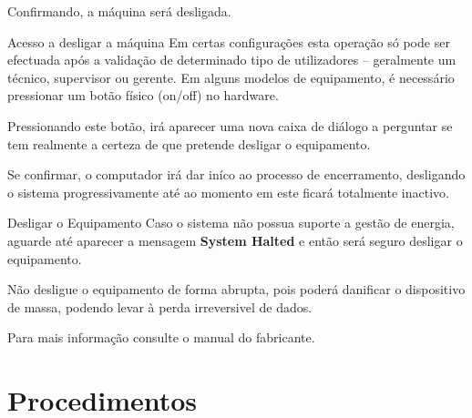 \documentclass[a4paper,11pt,openany]{memoir}
\begin{document}
Confirmando, a máquina será desligada.

\begin{bclogo}[couleur=blue!10,arrondi=0.1,logo=\bclampe,ombre=true]{Acesso a desligar a máquina}
Em certas configurações esta operação só pode ser efectuada após a validação de
determinado tipo de utilizadores – geralmente um técnico, supervisor ou gerente.
Em alguns modelos de equipamento, é necessário pressionar um botão físico
(on/off) no hardware.
\end{bclogo}

Pressionando este botão, irá aparecer uma nova caixa de diálogo a perguntar se tem realmente a certeza
de que pretende desligar o equipamento.

Se confirmar, o computador irá dar iníco ao processo de encerramento, desligando o sistema progressivamente
até ao momento em este ficará totalmente inactivo.

\begin{bclogo}[couleur=red!30,arrondi=0.1,logo=\bcbombe,ombre=true]{Desligar o Equipamento}
        Caso o sistema não possua suporte a gestão de energia,
	aguarde até aparecer a mensagem \textbf{System Halted} e então será seguro desligar o equipamento.
	
	Não desligue o equipamento de forma abrupta, pois poderá danificar o dispositivo de massa, 
	podendo levar à perda irreversivel de dados.
\end{bclogo}






Para mais informação consulte o manual do fabricante.





% 


% 

\part{Procedimentos}

\end{document}
